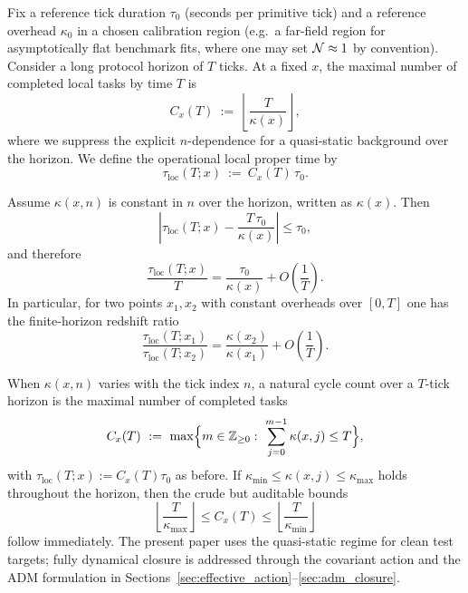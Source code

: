 Fix a reference tick duration $\tau_0$ (seconds per primitive tick) and a reference overhead $\kappa_0$ in a chosen calibration region (e.g.\ a far-field region for asymptotically flat benchmark fits, where one may set $\mathcal{N}\approx 1$ by convention).
Consider a long protocol horizon of $T$ ticks.
At a fixed $x$, the maximal number of completed local tasks by time $T$ is
\begin{equation}
  C_x(T)\ :=\ \left\lfloor \frac{T}{\kappa(x)} \right\rfloor,
\end{equation}
where we suppress the explicit $n$-dependence for a quasi-static background over the horizon.
We define the operational local proper time by
\begin{equation}
  \tau_{\mathrm{loc}}(T;x)\ :=\ C_x(T)\,\tau_0.
\end{equation}

\begin{proposition}
\label{prop:finite_horizon_proper_time}
Assume $\kappa(x,n)$ is constant in $n$ over the horizon, written as $\kappa(x)$.
Then
\begin{equation}
  \left\lvert
  \tau_{\mathrm{loc}}(T;x) - \frac{T\,\tau_0}{\kappa(x)}
  \right\rvert
  \le \tau_0,
  \label{eq:tau_loc_floor_error}
\end{equation}
and therefore
\begin{equation}
  \frac{\tau_{\mathrm{loc}}(T;x)}{T}
  = \frac{\tau_0}{\kappa(x)} + O\!\left(\frac{1}{T}\right).
  \label{eq:tau_loc_rate}
\end{equation}
In particular, for two points $x_1,x_2$ with constant overheads over $[0,T]$ one has the finite-horizon redshift ratio
\begin{equation}
  \frac{\tau_{\mathrm{loc}}(T;x_1)}{\tau_{\mathrm{loc}}(T;x_2)}
  = \frac{\kappa(x_2)}{\kappa(x_1)} + O\!\left(\frac{1}{T}\right).
  \label{eq:finite_horizon_redshift_ratio}
\end{equation}
\end{proposition}

\begin{remark}
\label{rem:time_dependent_overhead}
When $\kappa(x,n)$ varies with the tick index $n$, a natural cycle count over a $T$-tick horizon is the maximal number of completed tasks
\begin{equation}
  C_x(T)\ :=\ \max\Bigl\{m\in\ZZ_{\ge 0}:\ \sum_{j=0}^{m-1}\kappa(x,j)\le T\Bigr\},
\end{equation}
with $\tau_{\mathrm{loc}}(T;x):=C_x(T)\tau_0$ as before.
If $\kappa_{\min}\le \kappa(x,j)\le \kappa_{\max}$ holds throughout the horizon, then the crude but auditable bounds
\begin{equation}
  \left\lfloor \frac{T}{\kappa_{\max}}\right\rfloor
  \le C_x(T)
  \le \left\lfloor \frac{T}{\kappa_{\min}}\right\rfloor
\end{equation}
follow immediately.
The present paper uses the quasi-static regime for clean test targets; fully dynamical closure is addressed through the covariant action and the ADM formulation in Sections~\ref{sec:effective_action}--\ref{sec:adm_closure}.
\end{remark}

